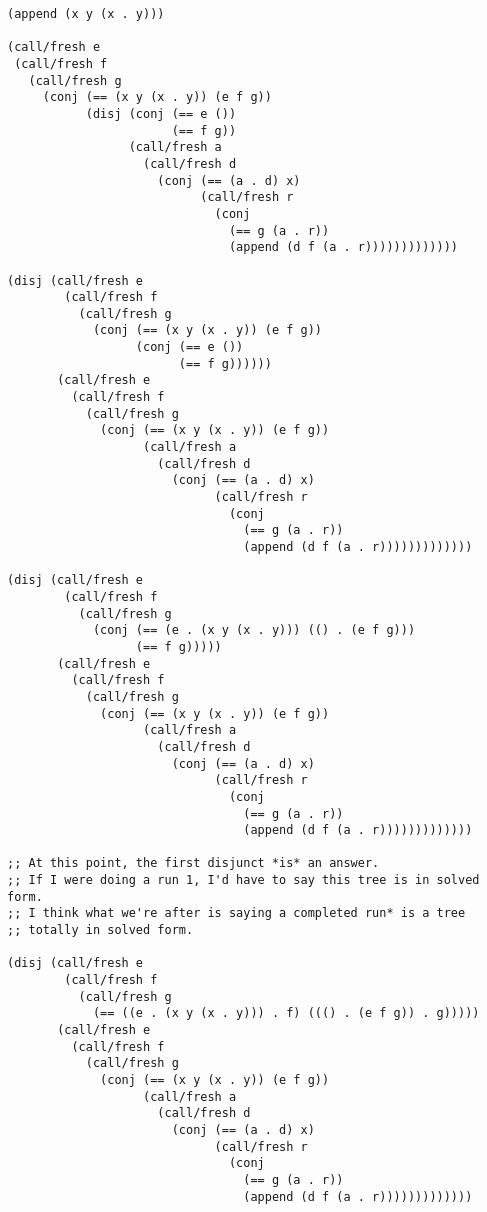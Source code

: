 \documentclass[11pt,twoside]{article}
\numberwithin{equation}{subsection} %
\begin{document}
\begin{Verbatim}
(append (x y (x . y)))

(call/fresh e
 (call/fresh f
   (call/fresh g 
     (conj (== (x y (x . y)) (e f g))
           (disj (conj (== e ())
                       (== f g))
                 (call/fresh a
                   (call/fresh d 
                     (conj (== (a . d) x)
                           (call/fresh r
                             (conj
                               (== g (a . r))
                               (append (d f (a . r)))))))))))))

(disj (call/fresh e
        (call/fresh f
          (call/fresh g 
            (conj (== (x y (x . y)) (e f g))
                  (conj (== e ())
                        (== f g))))))
       (call/fresh e
         (call/fresh f
           (call/fresh g 
             (conj (== (x y (x . y)) (e f g))
                   (call/fresh a
                     (call/fresh d 
                       (conj (== (a . d) x)
                             (call/fresh r
                               (conj 
                                 (== g (a . r))
                                 (append (d f (a . r)))))))))))))

(disj (call/fresh e
        (call/fresh f
          (call/fresh g 
            (conj (== (e . (x y (x . y))) (() . (e f g)))
                  (== f g)))))
       (call/fresh e
         (call/fresh f
           (call/fresh g 
             (conj (== (x y (x . y)) (e f g))
                   (call/fresh a
                     (call/fresh d 
                       (conj (== (a . d) x)
                             (call/fresh r
                               (conj
                                 (== g (a . r))
                                 (append (d f (a . r)))))))))))))

;; At this point, the first disjunct *is* an answer. 
;; If I were doing a run 1, I'd have to say this tree is in solved form. 
;; I think what we're after is saying a completed run* is a tree
;; totally in solved form.

(disj (call/fresh e
        (call/fresh f
          (call/fresh g 
            (== ((e . (x y (x . y))) . f) ((() . (e f g)) . g)))))
       (call/fresh e
         (call/fresh f
           (call/fresh g 
             (conj (== (x y (x . y)) (e f g))
                   (call/fresh a
                     (call/fresh d 
                       (conj (== (a . d) x)
                             (call/fresh r
                               (conj
                                 (== g (a . r))
                                 (append (d f (a . r)))))))))))))


\end{Verbatim}
\end{document}
